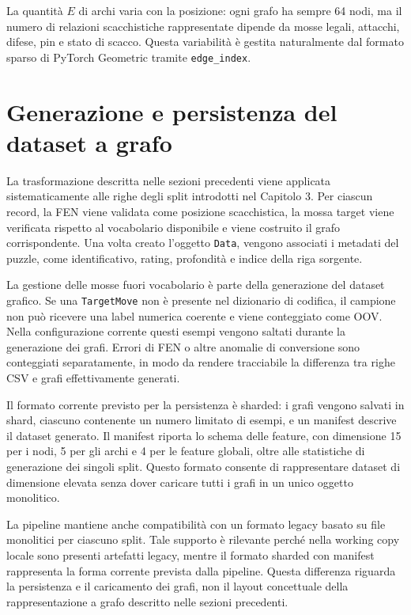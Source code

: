 La quantit\`a \(E\) di archi varia con la posizione: ogni grafo ha sempre 64 nodi, ma il numero di relazioni scacchistiche rappresentate dipende da mosse legali, attacchi, difese, pin e stato di scacco. Questa variabilit\`a \`e gestita naturalmente dal formato sparso di PyTorch Geometric tramite \texttt{edge\_index}.

\section{Generazione e persistenza del dataset a grafo}

La trasformazione descritta nelle sezioni precedenti viene applicata sistematicamente alle righe degli split introdotti nel Capitolo 3. Per ciascun record, la FEN viene validata come posizione scacchistica, la mossa target viene verificata rispetto al vocabolario disponibile e viene costruito il grafo corrispondente. Una volta creato l'oggetto \texttt{Data}, vengono associati i metadati del puzzle, come identificativo, rating, profondit\`a e indice della riga sorgente.

La gestione delle mosse fuori vocabolario \`e parte della generazione del dataset grafico. Se una \texttt{TargetMove} non \`e presente nel dizionario di codifica, il campione non pu\`o ricevere una label numerica coerente e viene conteggiato come OOV. Nella configurazione corrente questi esempi vengono saltati durante la generazione dei grafi. Errori di FEN o altre anomalie di conversione sono conteggiati separatamente, in modo da rendere tracciabile la differenza tra righe CSV e grafi effettivamente generati.

Il formato corrente previsto per la persistenza \`e sharded: i grafi vengono salvati in shard, ciascuno contenente un numero limitato di esempi, e un manifest descrive il dataset generato. Il manifest riporta lo schema delle feature, con dimensione 15 per i nodi, 5 per gli archi e 4 per le feature globali, oltre alle statistiche di generazione dei singoli split. Questo formato consente di rappresentare dataset di dimensione elevata senza dover caricare tutti i grafi in un unico oggetto monolitico.

La pipeline mantiene anche compatibilit\`a con un formato legacy basato su file monolitici per ciascuno split. Tale supporto \`e rilevante perch\'e nella working copy locale sono presenti artefatti legacy, mentre il formato sharded con manifest rappresenta la forma corrente prevista dalla pipeline. Questa differenza riguarda la persistenza e il caricamento dei grafi, non il layout concettuale della rappresentazione a grafo descritto nelle sezioni precedenti.
